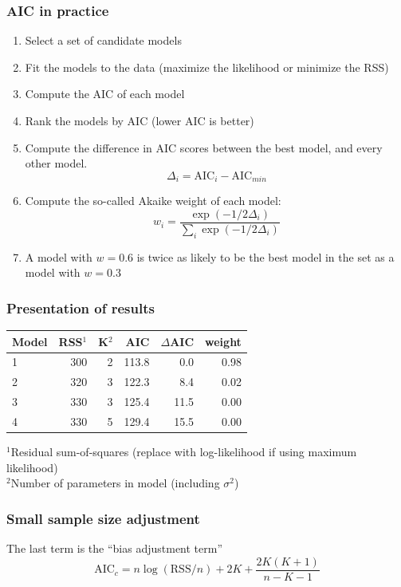\documentclass[color=usenames,dvipsnames]{beamer}\usepackage[]{graphicx}\usepackage[]{color}
\begin{document}
\begin{frame}
  \frametitle{AIC in practice}
  \large
\begin{enumerate}[<+- | visible@+->][\bf \color{PineGreen} (1)]
  \item Select a set of candidate models
  \item Fit the models to the data (maximize the likelihood or
    minimize the RSS)
  \item Compute the AIC of each model
  \item Rank the models by AIC (lower AIC is better)
  \item Compute the difference in AIC scores between the
    best model, and every other model.
    \[
    \Delta_i = \text{AIC}_i - \text{AIC}_{min}
    \]
  \item Compute the so-called Akaike weight of each model:
    \[
    w_i = \frac{\exp(-1/2\Delta_i)}{\sum_i \exp(-1/2\Delta_i)}
    \]
  \item A model with $w=0.6$ is twice as likely to be the best model
    in the set as a model with $w=0.3$
\end{enumerate}
\end{frame}



\begin{frame}
  \frametitle{Presentation of results}
  \begin{center}
    \begin{tabular}{lrrrrr}
      \hline
      Model  & RSS$^1$ & K$^2$ & AIC & $\Delta$AIC & weight \\
      \hline
      1 & 300 & 2 & 113.8 & 0.0    & 0.98 \\
      2 & 320 & 3 & 122.3 & 8.4    & 0.02 \\
      3 & 330 & 3 & 125.4 & 11.5   & 0.00 \\
      4 & 330 & 5 & 129.4 & 15.5   & 0.00 \\
      \hline
    \end{tabular} \par
    \scriptsize
    $^1$Residual sum-of-squares (replace with log-likelihood if using
    maximum likelihood) \\
    $^2$Number of parameters in model (including $\sigma^2$) \par
  \end{center}
\end{frame}



\begin{frame}
  \frametitle{Small sample size adjustment}
  The last term is the ``bias adjustment term''
  \[
  \mathrm{AIC}_c = n\log(\mathrm{RSS}/n) + 2K + \frac{2K(K+1)}{n-K-1}
  \]
\end{frame}
\end{document}
